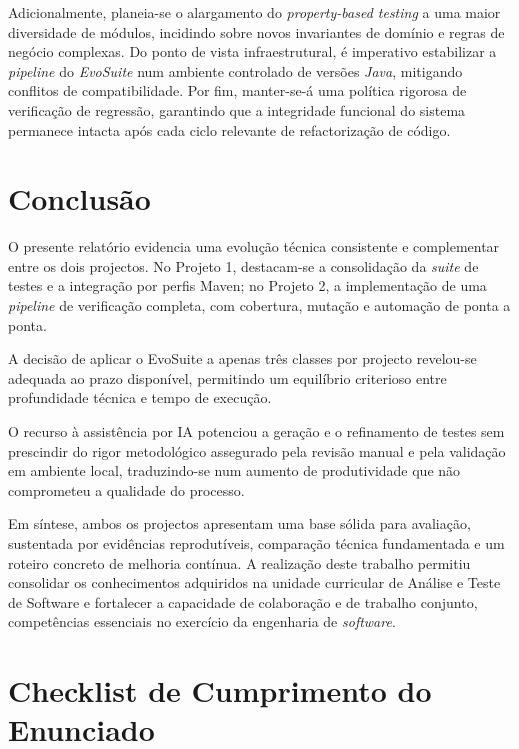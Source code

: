 \documentclass{article}
\begin{document}
Adicionalmente, planeia-se o alargamento do \emph{property-based testing} a uma maior diversidade de módulos, incidindo sobre novos invariantes de domínio e regras de negócio complexas. Do ponto de vista infraestrutural, é imperativo estabilizar a \emph{pipeline} do \emph{EvoSuite} num ambiente controlado de versões \emph{Java}, mitigando conflitos de compatibilidade. Por fim, manter-se-á uma política rigorosa de verificação de regressão, garantindo que a integridade funcional do sistema permanece intacta após cada ciclo relevante de refactorização de código.

\section{Conclusão}

O presente relatório evidencia uma evolução técnica consistente e complementar entre os dois projectos. No Projeto 1, destacam-se a consolidação da \emph{suite} de testes e a integração por perfis Maven; no Projeto 2, a implementação de uma \emph{pipeline} de verificação completa, com cobertura, mutação e automação de ponta a ponta.

A decisão de aplicar o EvoSuite a apenas três classes por projecto revelou-se adequada ao prazo disponível, permitindo um equilíbrio criterioso entre profundidade técnica e tempo de execução.

O recurso à assistência por IA potenciou a geração e o refinamento de testes sem prescindir do rigor metodológico assegurado pela revisão manual e pela validação em ambiente local, traduzindo-se num aumento de produtividade que não comprometeu a qualidade do processo.

Em síntese, ambos os projectos apresentam uma base sólida para avaliação, sustentada por evidências reprodutíveis, comparação técnica fundamentada e um roteiro concreto de melhoria contínua. A realização deste trabalho permitiu consolidar os conhecimentos adquiridos na unidade curricular de Análise e Teste de Software e fortalecer a capacidade de colaboração e de trabalho conjunto, competências essenciais no exercício da engenharia de \emph{software}.
\clearpage

\appendix

\section{Checklist de Cumprimento do Enunciado}
\end{document}
